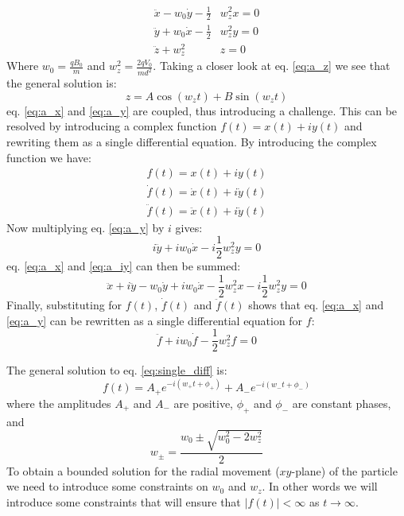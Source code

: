 \documentclass[english,notitlepage,reprint,nofootinbib]{revtex4-1}  %
\begin{document}
\begin{align}
    \ddot{x} - w_0 \dot{y} - \frac{1}{2} & w_z^2 x = 0 \label{eq:a_x} \\
    \ddot{y} + w_0 \dot{x} - \frac{1}{2} & w_z^2 y = 0 \label{eq:a_y} \\
    \ddot{z} + w_z^2                     & z = 0 \label{eq:a_z}
\end{align}
Where $w_0 = \frac{qB_0}{m}$ and $w_z^2 = \frac{2qV_0}{md^2}$. Taking a closer look at eq. \ref{eq:a_z} we see that the general solution is:
\begin{equation}
    z = A \cos(w_z t) + B \sin(w_z t)
\end{equation} \label{eq:z_general}
eq. \ref{eq:a_x} and \ref{eq:a_y} are coupled, thus introducing a challenge. This can be resolved by introducing a complex function $f(t) = x(t) + iy(t)$ and rewriting them as a single differential equation. By introducing the complex function we have:
\begin{align}
    f(t) = x(t) + iy(t)                   \\
    \dot{f}(t) = \dot{x}(t) + i\dot{y}(t) \\
    \ddot{f}(t) = \ddot{x}(t) + i\ddot{y}(t)
\end{align}
Now multiplying eq. \ref{eq:a_y} by $i$ gives:
\begin{equation}
    i\ddot{y} + iw_0 \dot{x} - i\frac{1}{2} w_z^2 y = 0 \label{eq:a_iy}
\end{equation}
eq. \ref{eq:a_x} and \ref{eq:a_iy} can then be summed:
\begin{equation}
    \ddot{x}+ i\ddot{y} - w_0 \dot{y} + iw_0 \dot{x} - \frac{1}{2} w_z^2 x - i\frac{1}{2} w_z^2 y= 0
\end{equation}
Finally, substituting for $f(t)$, $\dot{f}(t)$ and $\ddot{f}(t)$ shows that eq. \ref{eq:a_x} and \ref{eq:a_y} can be rewritten as a single differential equation for $f$:
\begin{equation}
    \ddot{f} + i w_0 \dot{f} - \frac{1}{2} w_z^2 f = 0 \label{eq:single_diff}
\end{equation}

The general solution to eq. \ref{eq:single_diff} is:
\begin{equation}
    f(t) = A_+ e^{-i(w_+ t + \phi_+)} + A_- e^{-i(w_- t + \phi_-)} \label{eq:general_sol_f}
\end{equation}
where the amplitudes $A_+$ and $A_-$ are positive, $\phi_+$ and $\phi_-$ are constant phases, and
\begin{equation}
    w_\pm = \frac{w_0 \pm \sqrt{w_0^2 - 2 w_z^2}}{2}
\end{equation}
To obtain a bounded solution for the radial movement ($xy$-plane) of the particle we need to introduce some constraints on $w_0$ and $w_z$. In other words we will introduce some constraints that will ensure that $|f(t)| < \infty$ as $t \rightarrow \infty$.
\end{document}
